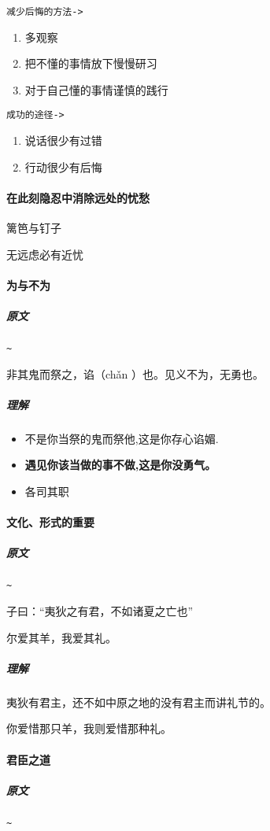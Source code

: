 \documentclass[UTF8,a4paper,8pt]{ctexbook}
\begin{document}
				
			\verb|减少后悔的方法->|
				\begin{enumerate}[itemindent = 2em]
					\item  多观察
					\item  把不懂的事情放下慢慢研习
					\item  对于自己懂的事情谨慎的践行									
				\end{enumerate}			

				
			\verb|成功的途径->|
				\begin{enumerate}[itemindent = 2em]
					\item 说话很少有过错
					\item 行动很少有后悔								
				\end{enumerate}

			
		\paragraph{在此刻隐忍中消除远处的忧愁} 篱笆与钉子
		
			无远虑必有近忧
		
		\paragraph{为与不为}
			\subparagraph{原文}\verb|~|
			
			 	非其鬼而祭之，谄（chǎn ）也。见义不为，无勇也。
			
			\subparagraph{理解}
				\begin{itemize}[itemindent=1em]
					\item 不是你当祭的鬼而祭他,这是你存心谄媚.
					\item \textbf{遇见你该当做的事不做,这是你没勇气。}
					\item 各司其职
				\end{itemize}
		
		\paragraph{文化、形式的重要}
			\subparagraph{原文}\verb|~|
				
				子曰：“夷狄之有君，不如诸夏之亡也”
			
				尔爱其羊，我爱其礼。
				
			\subparagraph{理解}
				夷狄有君主，还不如中原之地的没有君主而讲礼节的。
				
				你爱惜那只羊，我则爱惜那种礼。
		
		\paragraph{君臣之道}
			\subparagraph{原文}\verb|~|
			
\end{document}
